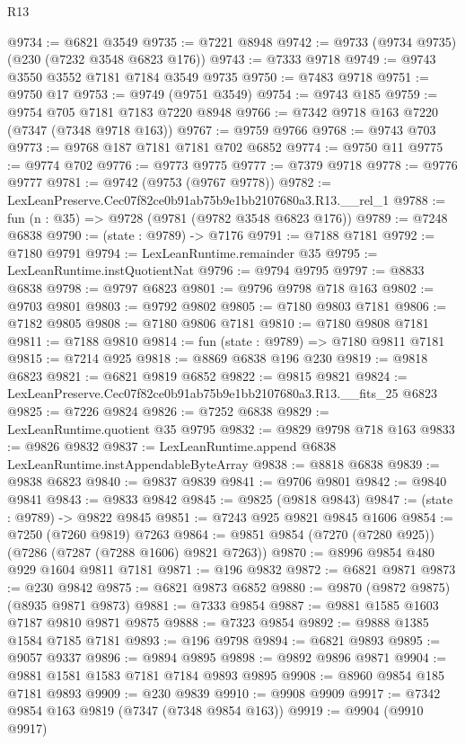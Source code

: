 \begin{lexlean}{R13}
\begin{coremodule}
@9734 := @6821 @3549
@9735 := @7221 @8948
@9742 := @9733 (@9734 @9735) (@230 (@7232 @3548 @6823 @176))
@9743 := @7333 @9718
@9749 := @9743 @3550 @3552 @7181 @7184 @3549 @9735
@9750 := @7483 @9718
@9751 := @9750 @17
@9753 := @9749 (@9751 @3549)
@9754 := @9743 @185
@9759 := @9754 @705 @7181 @7183 @7220 @8948
@9766 := @7342 @9718 @163 @7220 (@7347 (@7348 @9718 @163))
@9767 := @9759 @9766
@9768 := @9743 @703
@9773 := @9768 @187 @7181 @7181 @702 @6852
@9774 := @9750 @11
@9775 := @9774 @702
@9776 := @9773 @9775
@9777 := @7379 @9718
@9778 := @9776 @9777
@9781 := @9742 (@9753 (@9767 @9778))
@9782 := LexLeanPreserve.Cec07f82ce0b91ab75b9e1bb2107680a3.R13.__rel_1
@9788 := fun (n : @35) => @9728 (@9781 (@9782 @3548 @6823 @176))
@9789 := @7248 @6838
@9790 := (state : @9789) -> @7176
@9791 := @7188 @7181
@9792 := @7180 @9791
@9794 := LexLeanRuntime.remainder @35
@9795 := LexLeanRuntime.instQuotientNat
@9796 := @9794 @9795
@9797 := @8833 @6838
@9798 := @9797 @6823
@9801 := @9796 @9798 @718 @163
@9802 := @9703 @9801
@9803 := @9792 @9802
@9805 := @7180 @9803 @7181
@9806 := @7182 @9805
@9808 := @7180 @9806 @7181
@9810 := @7180 @9808 @7181
@9811 := @7188 @9810
@9814 := fun (state : @9789) => @7180 @9811 @7181
@9815 := @7214 @925
@9818 := @8869 @6838 @196 @230
@9819 := @9818 @6823
@9821 := @6821 @9819 @6852
@9822 := @9815 @9821
@9824 := LexLeanPreserve.Cec07f82ce0b91ab75b9e1bb2107680a3.R13.__fits_25 @6823
@9825 := @7226 @9824
@9826 := @7252 @6838
@9829 := LexLeanRuntime.quotient @35 @9795
@9832 := @9829 @9798 @718 @163
@9833 := @9826 @9832
@9837 := LexLeanRuntime.append @6838 LexLeanRuntime.instAppendableByteArray
@9838 := @8818 @6838
@9839 := @9838 @6823
@9840 := @9837 @9839
@9841 := @9706 @9801
@9842 := @9840 @9841
@9843 := @9833 @9842
@9845 := @9825 (@9818 @9843)
@9847 := (state : @9789) -> @9822 @9845
@9851 := @7243 @925 @9821 @9845 @1606
@9854 := @7250 (@7260 @9819) @7263
@9864 := @9851 @9854 (@7270 (@7280 @925)) (@7286 (@7287 (@7288 @1606) @9821 @7263))
@9870 := @8996 @9854 @480 @929 @1604 @9811 @7181
@9871 := @196 @9832
@9872 := @6821 @9871
@9873 := @230 @9842
@9875 := @6821 @9873 @6852
@9880 := @9870 (@9872 @9875) (@8935 @9871 @9873)
@9881 := @7333 @9854
@9887 := @9881 @1585 @1603 @7187 @9810 @9871 @9875
@9888 := @7323 @9854
@9892 := @9888 @1385 @1584 @7185 @7181
@9893 := @196 @9798
@9894 := @6821 @9893
@9895 := @9057 @9337
@9896 := @9894 @9895
@9898 := @9892 @9896 @9871
@9904 := @9881 @1581 @1583 @7181 @7184 @9893 @9895
@9908 := @8960 @9854 @185 @7181 @9893
@9909 := @230 @9839
@9910 := @9908 @9909
@9917 := @7342 @9854 @163 @9819 (@7347 (@7348 @9854 @163))
@9919 := @9904 (@9910 @9917)

\end{coremodule}
\end{lexlean}

